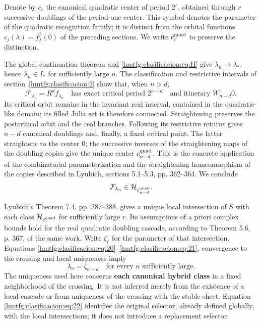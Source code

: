 Denote by \(c_r\) the canonical quadratic center of period \(2^r\), obtained through \(r\) successive doublings of the period-one center. This symbol denotes the parameter of the quadratic recognition family; it is distinct from the orbital functions \(c_j(\lambda)=f_\lambda^j(0)\) of the preceding sections. We write \(c_r^{\rm quad}\) to preserve the distinction.

The global continuation theorem and \eqref{hmtfg:clasificacion:eq:H} give \(\lambda_n\to\lambda_*\), hence \(\lambda_n\in I_*\) for sufficiently large \(n\). The classification and restrictive intervals of section~\ref{hmtfg:clasificacion:2} show that, when \(n>d\),
\begin{equation}
\mathcal F_{\lambda_n}=R^df_{\lambda_n}
\quad\text{has exact critical period }2^{n-d}
\quad\text{and itinerary }W_{n-d}0.
\label{hmtfg:clasificacion:eq:20}
\end{equation}
Its critical orbit remains in the invariant real interval, contained in the quadratic-like domain; its filled Julia set is therefore connected. Straightening preserves the postcritical orbit and the real branches. Following its restrictive returns gives \(n-d\) canonical doublings and, finally, a fixed critical point. The latter straightens to the center \(0\); the successive inverses of the straightening maps of the doubling copies give the unique center \(c_{n-d}^{\rm quad}\). This is the concrete application of the combinatorial parameterization and the straightening homeomorphism of the copies described in Lyubich, sections 5.1–5.3, pp. 362–364. We conclude
\begin{equation}
\mathcal F_{\lambda_n}\in\mathcal H_{c_{n-d}^{\rm quad}}.
\label{hmtfg:clasificacion:eq:21}
\end{equation}

Lyubich’s Theorem 7.4, pp. 387–388, gives a unique local intersection of \(S\) with each class \(\mathcal H_{c_r^{\rm quad}}\) for sufficiently large \(r\). Its assumptions of a priori complex bounds hold for the real quadratic doubling cascade, according to Theorem 5.6, p. 367, of the same work. Write \(\zeta_r\) for the parameter of that intersection. Equations \eqref{hmtfg:clasificacion:eq:20}–\eqref{hmtfg:clasificacion:eq:21}, convergence to the crossing and local uniqueness imply
\begin{equation}
\boxed{\lambda_n=\zeta_{n-d}\quad\text{for every }n\text{ sufficiently large}.}
\label{hmtfg:clasificacion:eq:22}
\end{equation}
The uniqueness used here concerns \textbf{each canonical hybrid class} in a fixed neighborhood of the crossing. It is not inferred merely from the existence of a local cascade or from uniqueness of the crossing with the stable sheet. Equation \eqref{hmtfg:clasificacion:eq:22} identifies the original selector, already defined globally, with the local intersections; it does not introduce a replacement selector.

